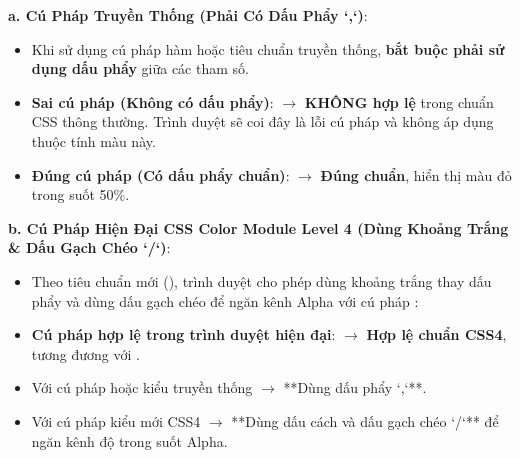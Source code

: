 \begin{conceptBox}
\textbf{a. Cú Pháp Truyền Thống (Phải Có Dấu Phẩy `,`)}:
\begin{itemize}[leftmargin=1.5em, itemsep=3pt, parsep=0pt]
    \item Khi sử dụng cú pháp hàm  hoặc  tiêu chuẩn truyền thống, \textbf{bắt buộc phải sử dụng dấu phẩy} giữa các tham số.
    \item \textcolor{red!80!black}{\textbf{Sai cú pháp (Không có dấu phẩy)}}:
     $\rightarrow$ \textcolor{red!80!black}{\textbf{KHÔNG hợp lệ}} trong chuẩn CSS thông thường. Trình duyệt sẽ coi đây là lỗi cú pháp và không áp dụng thuộc tính màu này.
    \item \textcolor{green!60!black}{\textbf{Đúng cú pháp (Có dấu phẩy chuẩn)}}:
     $\rightarrow$ \textcolor{green!60!black}{\textbf{Đúng chuẩn}}, hiển thị màu đỏ trong suốt 50\%.
\end{itemize}

\textbf{b. Cú Pháp Hiện Đại CSS Color Module Level 4 (Dùng Khoảng Trắng \& Dấu Gạch Chéo `/`)}:
\begin{itemize}[leftmargin=1.5em, itemsep=3pt, parsep=0pt]
    \item Theo tiêu chuẩn mới (), trình duyệt cho phép dùng khoảng trắng thay dấu phẩy và dùng dấu gạch chéo \codeinline{/} để ngăn kênh Alpha với cú pháp :
    \item \textcolor{green!60!black}{\textbf{Cú pháp hợp lệ trong trình duyệt hiện đại}}:
     $\rightarrow$ \textcolor{green!60!black}{\textbf{Hợp lệ chuẩn CSS4}}, tương đương với .
\end{itemize}
\end{conceptBox}

\begin{tipBox}
\begin{itemize}[leftmargin=1.5em, itemsep=3pt, parsep=0pt]
    \item Với cú pháp  hoặc  kiểu truyền thống $\rightarrow$ **Dùng dấu phẩy `,`**.
    \item Với cú pháp kiểu mới CSS4 $\rightarrow$ **Dùng dấu cách và dấu gạch chéo `/`** để ngăn kênh độ trong suốt Alpha.
\end{itemize}
\end{tipBox}

